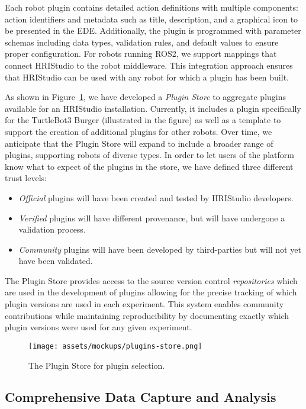 \documentclass[letterpaper, 10 pt, conference]{subfiles/ieeeconf}
\begin{document}
Each robot plugin contains detailed action definitions with multiple components: action identifiers and metadata such as title, description, and a graphical icon to be presented in the EDE. Additionally, the plugin is programmed with parameter schemas including data types, validation rules, and default values to ensure proper configuration. For robots running ROS2, we support mappings that connect HRIStudio to the robot middleware. This integration approach ensures that HRIStudio can be used with any robot for which a plugin has been built.
 
As shown in Figure~\ref{fig:plugins-store}, we have developed a \emph{Plugin Store} to aggregate plugins available for an HRIStudio installation. Currently, it includes a plugin specifically for the TurtleBot3 Burger (illustrated in the figure) as well as a template to support the creation of additional plugins for other robots. Over time, we anticipate that the Plugin Store will expand to include a broader range of plugins, supporting robots of diverse types. In order to let users of the platform know what to expect of the plugins in the store, we have defined three different trust levels:

\begin{itemize}
\item \emph{Official} plugins will have been created and tested by HRIStudio developers.
\item \emph{Verified} plugins will have different provenance, but will have undergone a validation process.
\item \emph{Community} plugins will have been developed by third-parties but will not yet have been validated.
\end{itemize}

The Plugin Store provides access to the source version control \emph{repositories} which are used in the development of plugins allowing for the precise tracking of which plugin versions are used in each experiment. This system enables community contributions while maintaining reproducibility by documenting exactly which plugin versions were used for any given experiment.

\begin{figure}[ht]
    \centering
\texttt{[image: assets/mockups/plugins-store.png]}
\caption{The Plugin Store for plugin selection.}
\label{fig:plugins-store}
\end{figure}

\subsection{Comprehensive Data Capture and Analysis}
\end{document}
